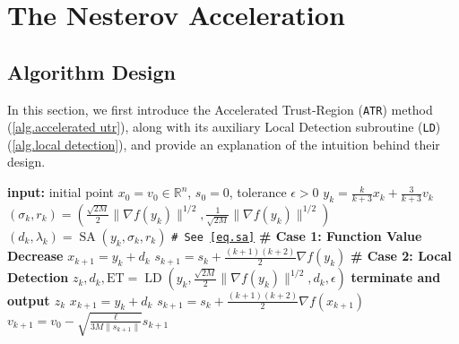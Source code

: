 \documentclass{article}
\begin{document}
\section{The Nesterov Acceleration}
\subsection{Algorithm Design}
In this section, we first introduce the Accelerated Trust-Region (\texttt{ATR}) method (\autoref{alg.accelerated utr}), along with its auxiliary Local Detection subroutine (\texttt{LD}) (\autoref{alg.local detection}), and provide an explanation of the intuition behind their design.
    \begin{algorithm}[ht]
    \caption{Accelerated Trust-Region Method (\atr{})}\label{alg.accelerated utr}
    \begin{algorithmic}[1]
        \STATE \textbf{input:} initial point $x_0=v_0\in \mathbb{R}^n$, $s_0=0$, tolerance $\epsilon>0$
        \STATE $y_k = \frac{k}{k+3}x_k+\frac{3}{k+3}v_k$
        \STATE $(\sigma_k,r_k) = (\tfrac{\sqrt{2M}}{2}\|\nabla f(y_k)\|^{1/2},\tfrac{1}{\sqrt{2M}}\|\nabla f(y_k)\|^{1/2})$
        \STATE $(d_k,\lambda_k) = \operatorname{SA}(y_k,\sigma_k,r_k)$ \hfill\texttt{\# See \eqref{eq.sa}}
         \label{line.if}
        \STATE \textbf{\# Case 1: Function Value Decrease}
        \STATE $x_{k+1}=y_k+d_k$
        \STATE $s_{k+1} = s_{k}+\frac{(k+1)(k+2)}{2}\nabla f(y_k)$
        \ELSE \label{line.else}
        \STATE \textbf{\# Case 2: Local Detection}
        \STATE $z_k,d_k,\text{ET} = \operatorname{LD}(y_k,\tfrac{\sqrt{2M}}{2}\|\nabla f(y_k)\|^{1/2},d_k,\epsilon)$
        \STATE \textbf{terminate and output $z_k$}
        \ENDIF
        \STATE $x_{k+1}=y_k+d_k$
        \STATE $s_{k+1} = s_{k}+\tfrac{(k+1)(k+2)}{2}\nabla f(x_{k+1})$
        \ENDIF
        \STATE $v_{k+1} = v_0-\sqrt{\tfrac{\ell}{3M\|s_{k+1}\|}}s_{k+1}$
        \ENDFOR
    \end{algorithmic}
\end{algorithm}
\end{document}
